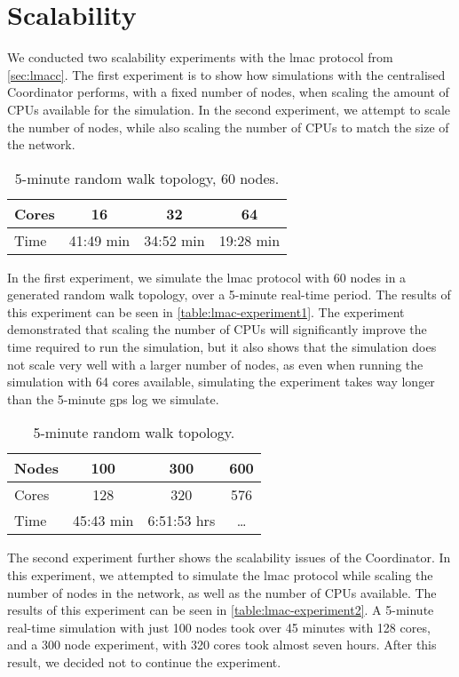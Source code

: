 \section{Scalability}\label{sec:scalability}
We conducted two scalability experiments with the \gls{lmac} protocol from \autoref{sec:lmacc}. The first
experiment is to show how simulations with the centralised Coordinator performs, with a fixed number of nodes,
when scaling the amount of CPUs available for the simulation. In the second experiment, we attempt to scale
the number of nodes, while also scaling the number of CPUs to match the size of the network.

\begin{table}[H]
    \begin{tabular}{|l|c|c|c|}
        \hline
        Cores & 16        & 32        & 64        \\ \hline
        Time  & 41:49 min & 34:52 min & 19:28 min \\ \hline
    \end{tabular}
    \caption{5-minute random walk topology, 60 nodes.}\label{table:lmac-experiment1}
\end{table}

In the first experiment, we simulate the \gls{lmac} protocol with 60 nodes in a generated random walk
topology, over a 5-minute real-time period. The results of this experiment can be seen in
\autoref{table:lmac-experiment1}. The experiment demonstrated that scaling the number of CPUs will
significantly improve the time required to run the simulation, but it also shows that the simulation does not
scale very well with a larger number of nodes, as even when running the simulation with 64 cores available,
simulating the experiment takes way longer than the 5-minute \gls{gps} log we simulate.

\begin{table}[H]
    \begin{tabular}{|l|c|c|c|}
        \hline
        Nodes & 100       & 300         & 600   \\ \hline
        Cores & 128       & 320         & 576   \\ \hline
        Time  & 45:43 min & 6:51:53 hrs & \dots \\ \hline
    \end{tabular}
    \caption{5-minute random walk topology.}\label{table:lmac-experiment2}
\end{table}

The second experiment further shows the scalability issues of the Coordinator. In this experiment, we
attempted to simulate the \gls{lmac} protocol while scaling the number of nodes in the network, as well as the
number of CPUs available. The results of this experiment can be seen in \autoref{table:lmac-experiment2}. A
5-minute real-time simulation with just 100 nodes took over 45 minutes with 128 cores, and a 300 node
experiment, with 320 cores took almost seven hours. After this result, we decided not to continue the
experiment.

